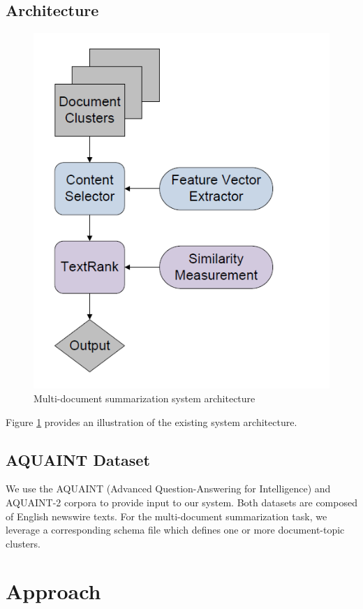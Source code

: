 \documentclass[11pt]{article}
\begin{document}
\subsection{Architecture}
\begin{figure}
  \includegraphics[width=\linewidth]{arch.PNG}
  \caption{Multi-document summarization system architecture}
  \label{fig:arch}
\end{figure}

Figure \ref{fig:arch} provides an illustration of the existing system architecture.

\subsection{AQUAINT Dataset}
We use the AQUAINT (Advanced Question-Answering for Intelligence) and AQUAINT-2 corpora to provide input to our system. Both datasets are composed of English newswire texts. For the multi-document summarization task, we leverage a corresponding schema file which defines one or more document-topic clusters. 

\section{Approach}
\end{document}
